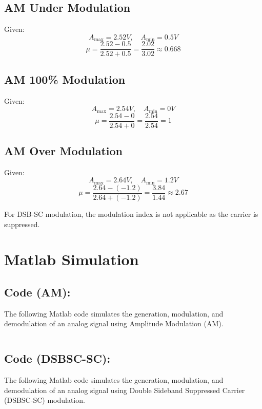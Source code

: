 \documentclass[12pt]{article}
\begin{document}
\subsection*{AM Under Modulation}
Given:
\[
    A_{\text{max}} = 2.52V, \quad A_{\text{min}} = 0.5V
\]
\[
    \mu = \frac{2.52 - 0.5}{2.52 + 0.5} = \frac{2.02}{3.02} \approx 0.668
\]

\subsection*{AM 100\% Modulation}
Given:
\[
    A_{\text{max}} = 2.54V, \quad A_{\text{min}} = 0V
\]
\[
    \mu = \frac{2.54 - 0}{2.54 + 0} = \frac{2.54}{2.54} = 1
\]

\subsection*{AM Over Modulation}
Given:
\[
    A_{\text{max}} = 2.64V, \quad A_{\text{min}} = 1.2V
\]
\[
    \mu = \frac{2.64 - (-1.2)}{2.64 + (-1.2)} = \frac{3.84}{1.44} \approx 2.67
\]

For DSB-SC modulation, the modulation index is not applicable as the carrier is suppressed.

\section*{Matlab Simulation}

\subsection*{Code (AM):}
The following Matlab code simulates the generation, modulation, and demodulation of an analog signal using Amplitude Modulation (AM).

\inputminted[linenos,breaklines,breakanywhere]{matlab}{./assets/am.m}

\subsection*{Code (DSB\-SC-SC):}
The following Matlab code simulates the generation, modulation, and demodulation of an analog signal using Double Sideband Suppressed Carrier (DSB\-SC-SC) modulation.

\inputminted[linenos,breaklines,breakanywhere]{matlab}{./assets/dsb-sc.m}
\end{document}
